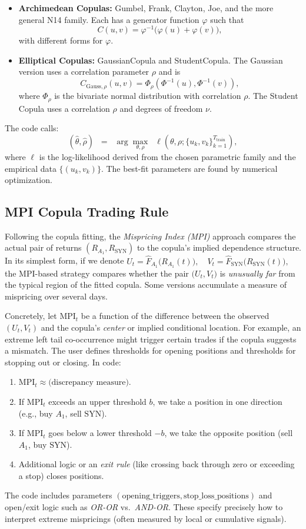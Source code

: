 \begin{itemize}
\item \textbf{Archimedean Copulas:} Gumbel, Frank, Clayton, Joe, and the more general N14 family. Each has a generator function \(\varphi\) such that 
\[
C(u,v) = \varphi^{-1}\bigl(\varphi(u) + \varphi(v)\bigr),
\]
with different forms for \(\varphi\).
\item \textbf{Elliptical Copulas:} GaussianCopula and StudentCopula. The Gaussian version uses a correlation parameter \(\rho\) and is
\[
C_{\text{Gauss},\rho}(u,v) = \Phi_\rho(\Phi^{-1}(u), \Phi^{-1}(v)),
\]
where \(\Phi_\rho\) is the bivariate normal distribution with correlation \(\rho\). The Student Copula uses a correlation \(\rho\) and degrees of freedom \(\nu\).
\end{itemize}

The code calls:
\[
(\hat{\theta}, \hat{\rho}) \;\;=\;\; \arg\max_{\theta, \rho}\;\; \ell(\theta,\rho; \{u_k,v_k\}_{k=1}^{T_{\text{train}}}),
\]
where \(\ell\) is the log-likelihood derived from the chosen parametric family and the empirical data \(\{(u_k,v_k)\}\). The best-fit parameters are found by numerical optimization.

\subsection*{MPI Copula Trading Rule}
Following the copula fitting, the \emph{Mispricing Index (MPI)} approach compares the actual pair of returns \((R_{A_1}, R_{\text{SYN}})\) to the copula's implied dependence structure. In its simplest form, if we denote
$
U_t = \hat{F}_{A_1}\bigl(R_{A_1}(t)\bigr), \quad
V_t = \hat{F}_{\text{SYN}}\bigl(R_{\text{SYN}}(t)\bigr),
$
the MPI-based strategy compares whether the pair $\bigl(U_t, V_t\bigr)$ is \emph{unusually far} from the typical region of the fitted copula. Some versions accumulate a measure of mispricing over several days.  

Concretely, let $\text{MPI}_t$ be a function of the difference between the observed $(U_t, V_t)$ and the copula's \emph{center} or implied conditional location. For example, an extreme left tail co-occurrence might trigger certain trades if the copula suggests a mismatch. The user defines thresholds for opening positions and thresholds for stopping out or closing. In code:
\begin{enumerate}
\item $\text{MPI}_t \approx \text{(discrepancy measure)}$.
\item If $\text{MPI}_t$ exceeds an upper threshold $b$, we take a position in one direction (e.g., buy $A_1$, sell $\text{SYN}$).  
\item If $\text{MPI}_t$ goes below a lower threshold $-b$, we take the opposite position (sell $A_1$, buy $\text{SYN}$).
\item Additional logic or an \emph{exit rule} (like crossing back through zero or exceeding a stop) closes positions.
\end{enumerate}
The code includes parameters $(\text{opening\_triggers}, \text{stop\_loss\_positions})$ and open/exit logic such as \emph{OR-OR} vs.\ \emph{AND-OR}. These specify precisely how to interpret extreme mispricings (often measured by local or cumulative signals).

